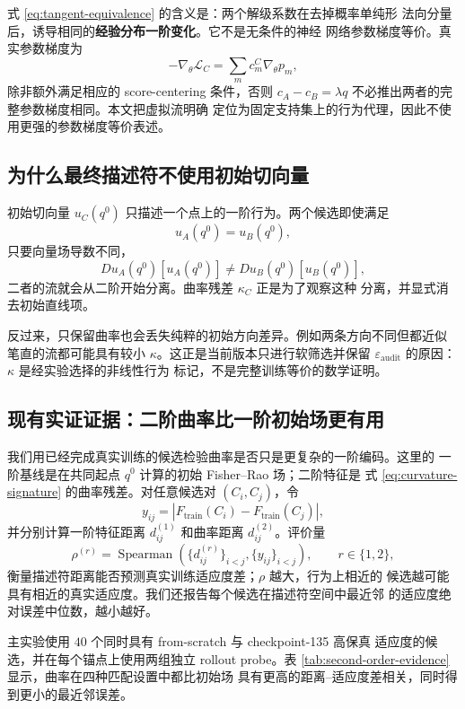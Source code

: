 \documentclass[UTF8,11pt]{ctexart}
\newcommand{\eps}{\varepsilon}
\begin{document}
式 \eqref{eq:tangent-equivalence} 的含义是：两个解级系数在去掉概率单纯形
法向分量后，诱导相同的\textbf{经验分布一阶变化}。它不是无条件的神经
网络参数梯度等价。真实参数梯度为
\[
    -\nabla_\theta\mathcal L_C
    =
    \sum_m c_m^C\nabla_\theta p_m,
\]
除非额外满足相应的 score-centering 条件，否则
\(c_A-c_B=\lambda q\) 不必推出两者的完整参数梯度相同。本文把虚拟流明确
定位为固定支持集上的行为代理，因此不使用更强的参数梯度等价表述。

\subsection{为什么最终描述符不使用初始切向量}

初始切向量 \(u_C(q^0)\) 只描述一个点上的一阶行为。两个候选即使满足
\[
    u_A(q^0)=u_B(q^0),
\]
只要向量场导数不同，
\[
    D u_A(q^0)[u_A(q^0)]
    \ne
    D u_B(q^0)[u_B(q^0)],
\]
二者的流就会从二阶开始分离。曲率残差 \(\kappa_C\) 正是为了观察这种
分离，并显式消去初始直线项。

反过来，只保留曲率也会丢失纯粹的初始方向差异。例如两条方向不同但都近似
笔直的流都可能具有较小 \(\kappa\)。这正是当前版本只进行软筛选并保留
\(\eps_{\mathrm{audit}}\) 的原因：\(\kappa\) 是经实验选择的非线性行为
标记，不是完整训练等价的数学证明。

\subsection{现有实证证据：二阶曲率比一阶初始场更有用}

我们用已经完成真实训练的候选检验曲率是否只是更复杂的一阶编码。这里的
一阶基线是在共同起点 \(q^0\) 计算的初始 Fisher--Rao 场；二阶特征是
式 \eqref{eq:curvature-signature} 的曲率残差。对任意候选对
\((C_i,C_j)\)，令
\[
    y_{ij}
    =
    \left|
    F_{\mathrm{train}}(C_i)-F_{\mathrm{train}}(C_j)
    \right|,
\]
并分别计算一阶特征距离 \(d^{(1)}_{ij}\) 和曲率距离
\(d^{(2)}_{ij}\)。评价量
\[
    \rho^{(r)}
    =
    \operatorname{Spearman}
    \left(
        \{d^{(r)}_{ij}\}_{i<j},
        \{y_{ij}\}_{i<j}
    \right),
    \qquad r\in\{1,2\},
\]
衡量描述符距离能否预测真实训练适应度差；\(\rho\) 越大，行为上相近的
候选越可能具有相近的真实适应度。我们还报告每个候选在描述符空间中最近邻
的适应度绝对误差中位数，越小越好。

主实验使用 \(40\) 个同时具有 from-scratch 与 checkpoint-135 高保真
适应度的候选，并在每个锚点上使用两组独立 rollout probe。表
\ref{tab:second-order-evidence} 显示，曲率在四种匹配设置中都比初始场
具有更高的距离--适应度差相关，同时得到更小的最近邻误差。
\end{document}
